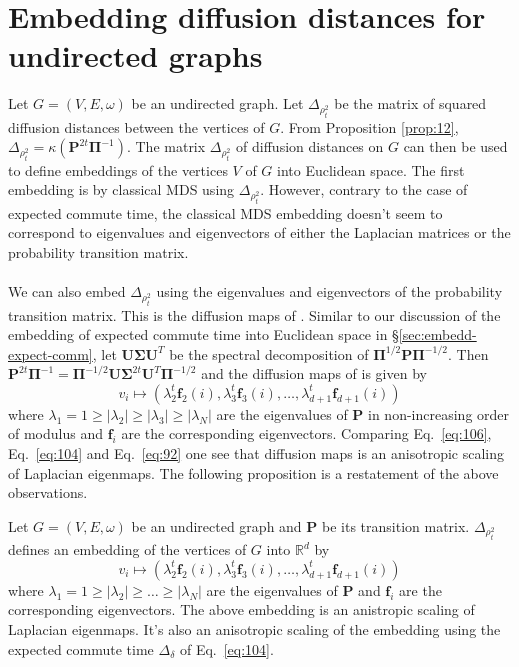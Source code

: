 \section{Embedding diffusion distances for undirected graphs}
\label{sec:embedd-diff-dist}
Let $G = (V,E,\omega)$ be an undirected graph. Let
$\Delta_{\rho_{t}^{2}}$ be the matrix of squared diffusion distances
between the vertices of $G$. From Proposition \ref{prop:12},
$\Delta_{\rho_{t}^{2}} = \kappa(\mathbf{P}^{2t} \bm{\Pi}^{-1})$. The
matrix $\Delta_{\rho_{t}^{2}}$ of diffusion distances on $G$ can then
be used to define embeddings of the vertices $V$ of $G$ into Euclidean
space. The first embedding is by classical MDS using
$\Delta_{\rho_{t}^{2}}$. However, contrary to the case of expected
commute time, the classical MDS embedding doesn't seem to correspond to
eigenvalues and eigenvectors of either the Laplacian matrices or the
probability transition matrix. \\ \\
%
%
\noindent
We can also embed $\Delta_{\rho_{t}^{2}}$ using the eigenvalues and
eigenvectors of the probability transition matrix. This is the
diffusion maps of \citet{coifman06:_diffus_maps}. Similar to our
discussion of the embedding of expected commute time into Euclidean
space in \S \ref{sec:embedd-expect-comm}, let
$\mathbf{U}\bm{\Sigma}\mathbf{U}^{T}$ be the spectral decomposition of
$\bm{\Pi}^{1/2}\mathbf{P}\bm{\Pi}^{-1/2}$. Then
$\mathbf{P}^{2t}\bm{\Pi}^{-1} =
\bm{\Pi}^{-1/2}\mathbf{U}\bm{\Sigma}^{2t}\mathbf{U}^{T}\bm{\Pi}^{-1/2}$
and the diffusion maps of \citet{coifman06:_diffus_maps} is given by
\begin{equation}
  \label{eq:106}
  v_i \mapsto (\lambda_{2}^{t} \mathbf{f}_{2}(i), \lambda_{3}^{t}
  \mathbf{f}_{3}(i), \dots, \lambda_{d+1}^{t} \mathbf{f}_{d+1}(i))
\end{equation}
where $\lambda_1 = 1 \geq |\lambda_2| \geq |\lambda_3| \geq
|\lambda_{N}|$ are the eigenvalues of $\mathbf{P}$ in non-increasing
order of modulus and $\mathbf{f}_i$ are the corresponding
eigenvectors. Comparing Eq.~\eqref{eq:106}, Eq.~\eqref{eq:104} and
Eq.~\eqref{eq:92} one see that diffusion maps is an anisotropic
scaling of Laplacian eigenmaps. The following proposition is a
restatement of the above observations.
\begin{proposition}
  \label{prop:22}
  Let $G = (V,E,\omega)$ be an undirected graph and $\mathbf{P}$ be
  its transition matrix. $\Delta_{\rho_{t}^{2}}$ defines an embedding
  of the vertices of $G$ into $\mathbb{R}^{d}$ by
  \begin{equation*}
    v_i \mapsto (\lambda_{2}^{t} \mathbf{f}_{2}(i), \lambda_{3}^{t}
    \mathbf{f}_{3}(i), \dots, \lambda_{d+1}^{t} \mathbf{f}_{d+1}(i))
  \end{equation*}
  where $\lambda_1 = 1 \geq |\lambda_2| \geq \dots \geq |\lambda_N|$
  are the eigenvalues of $\mathbf{P}$
  and $\mathbf{f}_{i}$ are the corresponding eigenvectors. The above
  embedding is an anistropic scaling of Laplacian eigenmaps. It's also an
  anisotropic scaling of the embedding using the
  expected commute time $\Delta_{\delta}$ of Eq.~\eqref{eq:104}.
\end{proposition}
